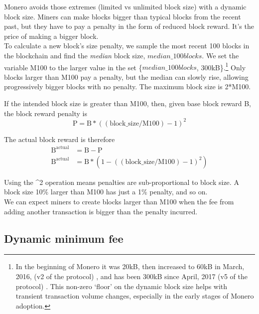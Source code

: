 Monero avoids those extremes (limited vs unlimited block size) with a dynamic block size. Miners can make blocks bigger than typical blocks from the recent past, but they have to pay a penalty in the form of reduced block reward. It's the price of making a bigger block.\\

To calculate a new block's size penalty, we sample the most recent 100 blocks in the blockchain and find the {\em median} block size, $\mathit{median\_100blocks}$. We set the variable M100 to the larger value in the set \{$\mathit{median\_100blocks}$, 300kB\}.\footnote{In the beginning of Monero it was 20kB, then increased to 60kB in March, 2016, (v2 of the protocol) \cite{monero-0.9.3}, and has been 300kB since April, 2017 (v5 of the protocol) \cite{monero-v5}. This non-zero `floor' on the dynamic block size helps with transient transaction volume changes, especially in the early stages of Monero adoption.} Only blocks larger than M100 pay a penalty, but the median can slowly rise, allowing progressively bigger blocks with no penalty. The maximum block size is 2*M100.

If the intended block size is greater than M100, then, given base block reward B, the block reward penalty is
\[ \textrm{P} = \textrm{B}*((\textrm{block\_size}/\textrm{M100}) - 1)^2 \]

The actual block reward is therefore\vspace{.3cm}
\begin{align*}
    \textrm{B}^{\textrm{actual}} &= \textrm{B} - \textrm{P} \\
    \textrm{B}^{\textrm{actual}} &= \textrm{B}*(1-((\textrm{block\_size}/\textrm{M100}) - 1)^2)
\end{align*}

Using the \^{}2 operation means penalties are sub-proportional to block size. A block size 10\% larger than M100 has just a 1\% penalty, and so on. \cite{monero-coin-emission}\\

We can expect miners to create blocks larger than M100 when the fee from adding another transaction is bigger than the penalty incurred.


\subsection{Dynamic minimum fee}
\label{subsec:dynamic-minimum-fee} %

